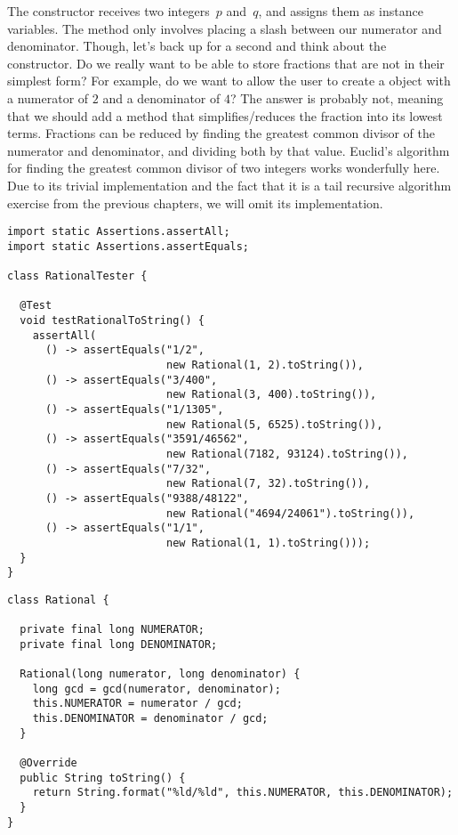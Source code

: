 The  constructor receives two integers~$p$ and~$q$, and assigns them as instance variables. 
The  method only involves placing a slash between our numerator and denominator. 
Though, let's back up for a second and think about the constructor. 
Do we really want to be able to store fractions that are not in their simplest form? 
For example, do we want to allow the user to create a  object with a numerator of $2$ and a denominator of $4$? 
The answer is probably not, meaning that we should add a method that simplifies/reduces the fraction into its lowest terms.
Fractions can be reduced by finding the greatest common divisor of the numerator and denominator, and dividing both by that value. 
Euclid's algorithm for finding the greatest common divisor of two integers works wonderfully here. 
Due to its trivial implementation and the fact that it is a tail recursive algorithm exercise from the previous chapters, we will omit its implementation.

\begin{lstlisting}[language=MyJava]
import static Assertions.assertAll;
import static Assertions.assertEquals;

class RationalTester {
  
  @Test
  void testRationalToString() {
    assertAll(
      () -> assertEquals("1/2", 
                         new Rational(1, 2).toString()),
      () -> assertEquals("3/400", 
                         new Rational(3, 400).toString()),
      () -> assertEquals("1/1305", 
                         new Rational(5, 6525).toString()),
      () -> assertEquals("3591/46562", 
                         new Rational(7182, 93124).toString()),
      () -> assertEquals("7/32", 
                         new Rational(7, 32).toString()),
      () -> assertEquals("9388/48122", 
                         new Rational("4694/24061").toString()),
      () -> assertEquals("1/1", 
                         new Rational(1, 1).toString()));
  }
}
\end{lstlisting}

\begin{lstlisting}[language=MyJava]
class Rational {
  
  private final long NUMERATOR;
  private final long DENOMINATOR;

  Rational(long numerator, long denominator) {
    long gcd = gcd(numerator, denominator);
    this.NUMERATOR = numerator / gcd;
    this.DENOMINATOR = denominator / gcd; 
  }

  @Override
  public String toString() {
    return String.format("%ld/%ld", this.NUMERATOR, this.DENOMINATOR);
  }
}
\end{lstlisting}

